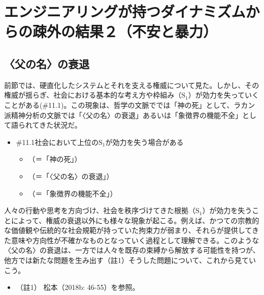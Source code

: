 \section{エンジニアリングが持つダイナミズムからの疎外の結果２（不安と暴力）}\label{ux30a8ux30f3ux30b8ux30cbux30a2ux30eaux30f3ux30b0ux304cux6301ux3064ux30c0ux30a4ux30caux30dfux30baux30e0ux304bux3089ux306eux758eux5916ux306eux7d50ux679cuxff12ux4e0dux5b89ux3068ux66b4ux529b}

\subsection{〈父の名〉の衰退}\label{ux7236ux306eux540dux306eux8870ux9000}

前節では、硬直化したシステムとそれを支える権威について見た。しかし、その権威が揺らぎ、社会における基本的な考え方や枠組み（\(\textrm{S}_1\)）が効力を失っていくことがある(\#11.1)。この現象は、哲学の文脈ででは「神の死」として、ラカン派精神分析の文脈では「〈父の名〉の衰退」あるいは「象徴界の機能不全」として語られてきた状況だ。

\begin{note}{}
  \begin{itemize}
    \tightlist
    \item{\#11.1}社会において上位の$\textrm{S}_1$が効力を失う場合がある
      \begin{itemize}
        \tightlist
        \item （＝「神の死」）
        \item （＝「〈父の名〉の衰退」）
        \item （＝「象徴界の機能不全」）
      \end{itemize}
  \end{itemize}
\end{note}

人々の行動や思考を方向づけ、社会を秩序づけてきた根拠（\(\textrm{S}_1\)）が効力を失うことによって、権威の衰退以外にも様々な現象が起こる。例えば、かつての宗教的な価値観や伝統的な社会規範が持っていた拘束力が弱まり、それらが提供してきた意味や方向性が不確かなものとなっていく過程として理解できる。このような〈父の名〉の衰退は、一方では人々を既存の束縛から解放する可能性を持つが、他方では新たな問題を生み出す（註1）そうした問題について、これから見ていこう。

\begin{itemize}
\tightlist
\item
  （註1） 松本（2018b: 46-55）\cite{Matsumoto2}を参照。
\end{itemize}

